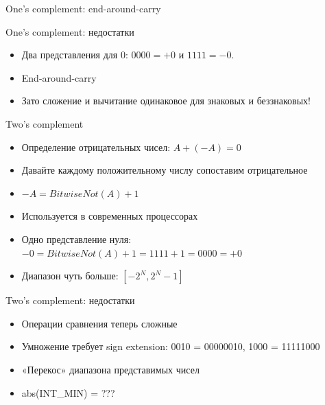 \documentclass[10pt,pdf,hyperref={unicode}]{beamer}
\begin{document}
\begin{frame}{One's complement: end-around-carry}
\end{frame}

\begin{frame}{One's complement: недостатки}
    \begin{itemize}
        \item Два представления для 0: $0000 = +0$ и $1111 = -0$.
        \item End-around-carry
        \item Зато сложение и вычитание одинаковое для знаковых и беззнаковых!
    \end{itemize}
\end{frame}

\begin{frame}{Two's complement}
    \begin{itemize}
        \item Определение отрицательных чисел: $A + (-A) = 0$
        \item Давайте каждому положительному числу сопоставим отрицательное
        \item $-A = BitwiseNot(A) + 1$
        \item Используется в современных процессорах
        \item Одно представление нуля: $-0 = BitwiseNot(A) + 1 = 1111 + 1 = 0000 = +0$
        \item Диапазон чуть больше: $[-2^N, 2^N-1]$
    \end{itemize}
\end{frame}

\begin{frame}{Two's complement: недостатки}
    \begin{itemize}
        \item Операции сравнения теперь сложные
        \item Умножение требует sign extension: 0010 = 00000010, 1000 = 11111000
        \item «Перекос» диапазона представимых чисел
        \item abs(INT\_MIN) = ???
    \end{itemize}
\end{frame}
\end{document}
